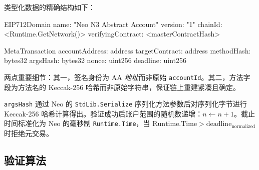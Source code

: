 \documentclass[10pt]{article}
\newcommand{\code}[1]{\texttt{\small #1}}
\begin{document}
类型化数据的精确结构如下：

\begin{codebox}[language=Java]
EIP712Domain {
  name: "Neo N3 Abstract Account"
  version: "1"
  chainId: <Runtime.GetNetwork()>
  verifyingContract: <masterContractHash>
}

MetaTransaction {
  accountAddress: address
  targetContract: address
  methodHash: bytes32
  argsHash: bytes32
  nonce: uint256
  deadline: uint256
}
\end{codebox}

两点重要细节：其一，签名身份为 AA \emph{地址}而非原始 \code{accountId}。其二，方法字段为方法名的 Keccak-256 哈希而非原始字符串，保证链上重建紧凑且确定。

\code{argsHash} 通过 Neo 的 \code{StdLib.Serialize} 序列化方法参数后对序列化字节进行 Keccak-256 哈希计算得出。验证成功后账户范围的随机数递增：$n \gets n + 1$。截止时间标准化为 Neo 的毫秒制 \code{Runtime.Time}，当 $\text{Runtime.Time} > \text{deadline}_{\text{normalized}}$ 时拒绝元交易。

\subsection{验证算法}
\end{document}
